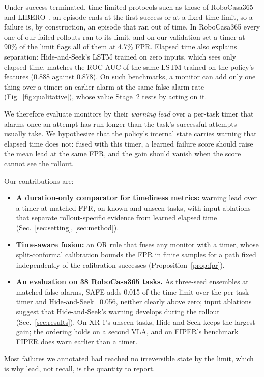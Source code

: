 \documentclass[conference]{IEEEtran}
\begin{document}
Under success-terminated, time-limited protocols such as those of RoboCasa365~\cite{robocasa365}
and LIBERO~\cite{liu2023libero}, an episode ends at the first success or at a fixed time limit,
so a failure is, by construction, an episode that ran out of time. In RoboCasa365 every one of
our failed rollouts ran to its limit, and on our validation set a timer at 90\% of the limit
flags all of them at 4.7\% FPR. Elapsed time also explains separation: Hide-and-Seek's LSTM
trained on zero inputs, which sees only elapsed time, matches the ROC-AUC of the same LSTM
trained on the policy's features (0.888 against 0.878). On such benchmarks, a monitor can add only one thing over a timer: an earlier
alarm at the same false-alarm rate (Fig.~\ref{fig:qualitative}), whose value Stage~2 tests by
acting on it.

We therefore evaluate monitors by their \emph{warning lead} over a per-task timer that alarms
once an attempt has run longer than the task's successful attempts usually take. We
hypothesize that the policy's internal state carries warning that elapsed time does not: fused
with this timer, a learned failure score should raise the mean lead at the same FPR, and the
gain should vanish when the score cannot see the rollout.

Our contributions are:
\begin{itemize}
  \item \textbf{A duration-only comparator for timeliness metrics:} warning lead over a timer at
  matched FPR, on known and unseen tasks, with input ablations that separate rollout-specific
  evidence from learned elapsed time (Sec.~\ref{sec:setting}, \ref{sec:method}).
  \item \textbf{Time-aware fusion:} an OR rule that fuses any monitor with a timer, whose
  split-conformal calibration bounds the FPR in finite samples for a path fixed independently of
  the calibration successes (Proposition~\ref{prop:fpr}).
  \item \textbf{An evaluation on 38 RoboCasa365 tasks.} As three-seed ensembles at matched false
  alarms, SAFE adds 0.015 of the time limit over the per-task timer and
  Hide-and-Seek~\cite{park2026hideseek} 0.056, neither clearly above zero; input ablations
  suggest that Hide-and-Seek's warning develops during the rollout (Sec.~\ref{sec:results}). On
  XR-1's unseen tasks, Hide-and-Seek keeps the largest gain; the ordering holds on a second VLA,
  and on FIPER's benchmark FIPER does warn earlier than a timer.
\end{itemize}
Most failures we annotated had reached no irreversible state by the limit, which is why lead,
not recall, is the quantity to report.
\end{document}

